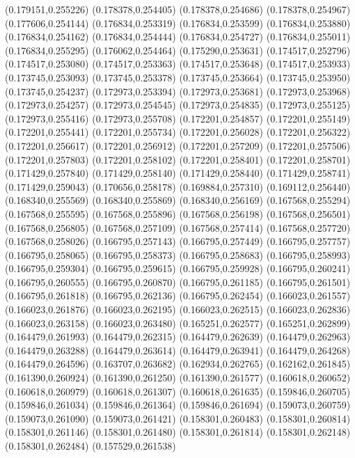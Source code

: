 (0.179151,0.255226)
(0.178378,0.254405)
(0.178378,0.254686)
(0.178378,0.254967)
(0.177606,0.254144)
(0.176834,0.253319)
(0.176834,0.253599)
(0.176834,0.253880)
(0.176834,0.254162)
(0.176834,0.254444)
(0.176834,0.254727)
(0.176834,0.255011)
(0.176834,0.255295)
(0.176062,0.254464)
(0.175290,0.253631)
(0.174517,0.252796)
(0.174517,0.253080)
(0.174517,0.253363)
(0.174517,0.253648)
(0.174517,0.253933)
(0.173745,0.253093)
(0.173745,0.253378)
(0.173745,0.253664)
(0.173745,0.253950)
(0.173745,0.254237)
(0.172973,0.253394)
(0.172973,0.253681)
(0.172973,0.253968)
(0.172973,0.254257)
(0.172973,0.254545)
(0.172973,0.254835)
(0.172973,0.255125)
(0.172973,0.255416)
(0.172973,0.255708)
(0.172201,0.254857)
(0.172201,0.255149)
(0.172201,0.255441)
(0.172201,0.255734)
(0.172201,0.256028)
(0.172201,0.256322)
(0.172201,0.256617)
(0.172201,0.256912)
(0.172201,0.257209)
(0.172201,0.257506)
(0.172201,0.257803)
(0.172201,0.258102)
(0.172201,0.258401)
(0.172201,0.258701)
(0.171429,0.257840)
(0.171429,0.258140)
(0.171429,0.258440)
(0.171429,0.258741)
(0.171429,0.259043)
(0.170656,0.258178)
(0.169884,0.257310)
(0.169112,0.256440)
(0.168340,0.255569)
(0.168340,0.255869)
(0.168340,0.256169)
(0.167568,0.255294)
(0.167568,0.255595)
(0.167568,0.255896)
(0.167568,0.256198)
(0.167568,0.256501)
(0.167568,0.256805)
(0.167568,0.257109)
(0.167568,0.257414)
(0.167568,0.257720)
(0.167568,0.258026)
(0.166795,0.257143)
(0.166795,0.257449)
(0.166795,0.257757)
(0.166795,0.258065)
(0.166795,0.258373)
(0.166795,0.258683)
(0.166795,0.258993)
(0.166795,0.259304)
(0.166795,0.259615)
(0.166795,0.259928)
(0.166795,0.260241)
(0.166795,0.260555)
(0.166795,0.260870)
(0.166795,0.261185)
(0.166795,0.261501)
(0.166795,0.261818)
(0.166795,0.262136)
(0.166795,0.262454)
(0.166023,0.261557)
(0.166023,0.261876)
(0.166023,0.262195)
(0.166023,0.262515)
(0.166023,0.262836)
(0.166023,0.263158)
(0.166023,0.263480)
(0.165251,0.262577)
(0.165251,0.262899)
(0.164479,0.261993)
(0.164479,0.262315)
(0.164479,0.262639)
(0.164479,0.262963)
(0.164479,0.263288)
(0.164479,0.263614)
(0.164479,0.263941)
(0.164479,0.264268)
(0.164479,0.264596)
(0.163707,0.263682)
(0.162934,0.262765)
(0.162162,0.261845)
(0.161390,0.260924)
(0.161390,0.261250)
(0.161390,0.261577)
(0.160618,0.260652)
(0.160618,0.260979)
(0.160618,0.261307)
(0.160618,0.261635)
(0.159846,0.260705)
(0.159846,0.261034)
(0.159846,0.261364)
(0.159846,0.261694)
(0.159073,0.260759)
(0.159073,0.261090)
(0.159073,0.261421)
(0.158301,0.260483)
(0.158301,0.260814)
(0.158301,0.261146)
(0.158301,0.261480)
(0.158301,0.261814)
(0.158301,0.262148)
(0.158301,0.262484)
(0.157529,0.261538)
